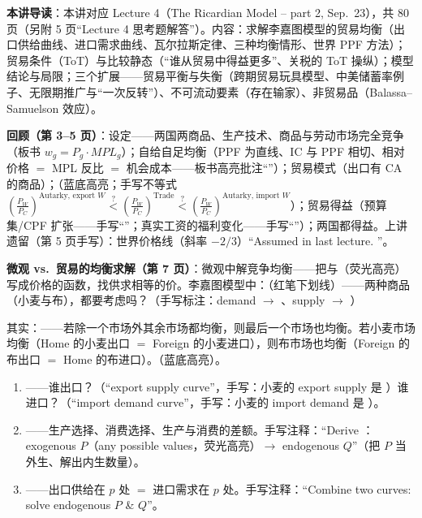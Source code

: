 
\textbf{本讲导读}：本讲对应 Lecture 4（The Ricardian Model -- part 2, Sep.\ 23），共 80 页（另附 5 页``Lecture 4 思考题解答''）。内容：求解李嘉图模型的贸易均衡（出口供给曲线、进口需求曲线、瓦尔拉斯定律、三种均衡情形、世界 PPF 方法）；贸易条件（ToT）与比较静态（``谁从贸易中得益更多''、关税的 ToT 操纵）；模型结论与局限；三个扩展——贸易平衡与失衡（跨期贸易玩具模型、中美储蓄率例子、无限期推广与``一次反转''）、不可流动要素（存在输家）、非贸易品（Balassa--Samuelson 效应）。


\textbf{回顾（第 3--5 页）}：设定——两国两商品、生产技术、商品与劳动市场完全竞争（板书 $w_g = P_g \cdot MPL_g$）；自给自足均衡（PPF 为直线、IC 与 PPF 相切、相对价格 $=$ MPL 反比 $=$ 机会成本——板书高亮批注``''）；贸易模式（出口有 CA 的商品）；（蓝底高亮；手写不等式 $(\frac{P_W}{P_C})^{\text{Autarky, export } W} \overset{?}{<} (\frac{P_W}{P_C})^{\text{Trade}} \overset{?}{<} (\frac{P_W}{P_C})^{\text{Autarky, import } W}$）；贸易得益（预算集/CPF 扩张——手写``''；真实工资的福利变化——手写``''）；两国都得益。上讲遗留（第 5 页手写）：世界价格线（斜率 $-2/3$）``Assumed in last lecture. ''。

\textbf{微观 vs.\ 贸易的均衡求解（第 7 页）}：微观中解竞争均衡——把与（荧光高亮）写成价格的函数，找供求相等的价。李嘉图模型中：（红笔下划线）——两种商品（小麦与布），都要考虑吗？（手写标注：demand $\to$ 、supply $\to$ ）

\begin{thmbox}
其实：——若除一个市场外其余市场都均衡，则最后一个市场也均衡。若小麦市场均衡（Home 的小麦出口 $=$ Foreign 的小麦进口），则布市场也均衡（Foreign 的布出口 $=$ Home 的布进口）。（蓝底高亮）。
\end{thmbox}

\begin{mapbox}
\begin{enumerate}
  \item {}——谁出口？（``export supply curve''，手写：小麦的 export supply 是 ）谁进口？（``import demand curve''，手写：小麦的 import demand 是 ）。
  \item {}——生产选择、消费选择、生产与消费的差额。手写注释：``Derive ：exogenous $P$（any possible values，荧光高亮）$\to$ endogenous $Q$''（把 $P$ 当外生、解出内生数量）。
  \item {}——出口供给在 $p$ 处 $=$ 进口需求在 $p$ 处。手写注释：``Combine two curves: solve endogenous $P$ \& $Q$''。
\end{enumerate}
\end{mapbox}

